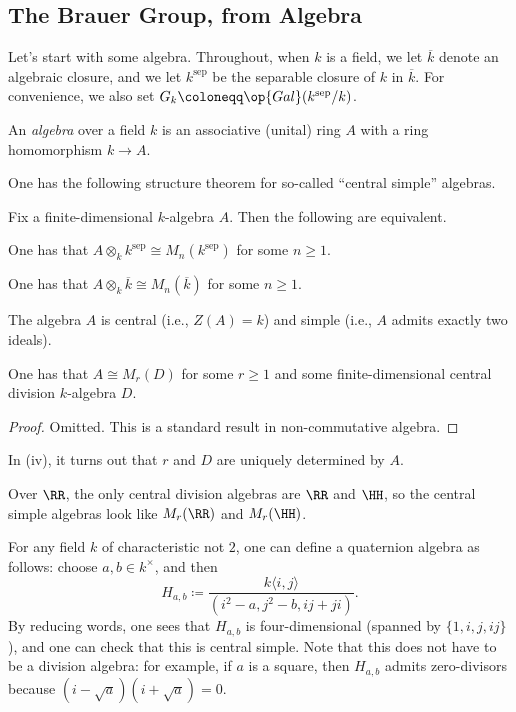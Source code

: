 \documentclass[../notes.tex]{subfiles}
\begin{document}
\subsection{The Brauer Group, from Algebra}
Let's start with some algebra. Throughout, when $k$ is a field, we let $\overline k$ denote an algebraic closure, and we let $k^{\mathrm{sep}}$ be the separable closure of $k$ in $\overline k$. For convenience, we also set $G_k\coloneqq\op{Gal}(k^{\mathrm{sep}}/k)$.
\begin{definition}
	An \textit{algebra} over a field $k$ is an associative (unital) ring $A$ with a ring homomorphism $k\to A$.
\end{definition}
One has the following structure theorem for so-called ``central simple'' algebras.
\begin{proposition} \label{prop:csa-grab-bag}
	Fix a finite-dimensional $k$-algebra $A$. Then the following are equivalent.
	\begin{listroman}
		\item One has that $A\otimes_kk^{\mathrm{sep}}\cong M_n(k^{\mathrm{sep}})$ for some $n\ge1$.
		\item One has that $A\otimes_k\overline k\cong M_n(\overline k)$ for some $n\ge1$.
		\item The algebra $A$ is central (i.e., $Z(A)=k$) and simple (i.e., $A$ admits exactly two ideals).
		\item One has that $A\cong M_r(D)$ for some $r\ge1$ and some finite-dimensional central division $k$-algebra $D$.
	\end{listroman}
\end{proposition}
\begin{proof}
	Omitted. This is a standard result in non-commutative algebra.
\end{proof}
\begin{remark}
	In (iv), it turns out that $r$ and $D$ are uniquely determined by $A$.
\end{remark}
\begin{example} \label{ex:real-csa}
	Over $\RR$, the only central division algebras are $\RR$ and $\HH$, so the central simple algebras look like $M_r(\RR)$ and $M_r(\HH)$.
\end{example}
\begin{example} \label{ex:quaternion-csa}
	For any field $k$ of characteristic not $2$, one can define a quaternion algebra as follows: choose $a,b\in k^\times$, and then
	\[H_{a,b}\coloneqq\frac{k\langle i,j\rangle}{\left(i^2-a,j^2-b,ij+ji\right)}.\]
	By reducing words, one sees that $H_{a,b}$ is four-dimensional (spanned by $\{1,i,j,ij\}$), and one can check that this is central simple. Note that this does not have to be a division algebra: for example, if $a$ is a square, then $H_{a,b}$ admits zero-divisors because $(i-\sqrt a)(i+\sqrt a)=0$.
\end{example}
\end{document}

